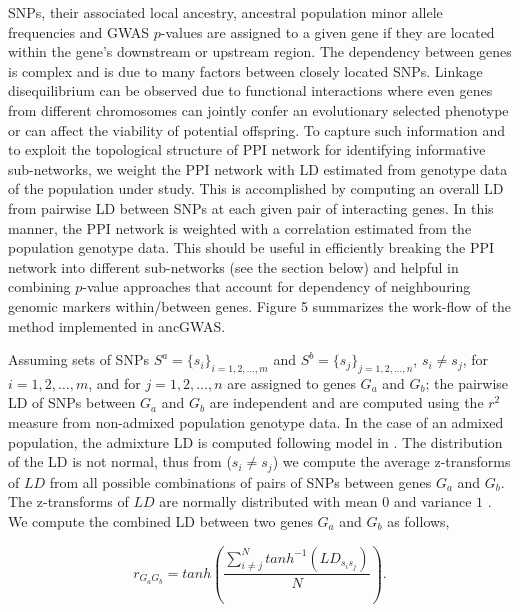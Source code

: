 \documentclass[10pt]{article}
\begin{document}
SNPs, their associated local ancestry, ancestral population minor allele frequencies and GWAS $p$-values are assigned to a given gene if they are located within the gene's downstream or upstream region. The dependency between genes is complex and is due to many factors \cite{lith,wu,peng} between closely located SNPs. Linkage disequilibrium can be observed due to functional interactions where even genes from different chromosomes can jointly confer an evolutionary selected phenotype or can affect the viability of potential offspring. To capture such information and to exploit the topological structure of PPI network for identifying informative sub-networks, we weight the PPI network with LD estimated from genotype data of the population under study. This is accomplished by computing an overall LD from pairwise LD between SNPs at each given pair of interacting genes. In this manner, the PPI network is weighted with a correlation estimated from the population genotype data. This should be useful in efficiently breaking the PPI network into different sub-networks (see the section below) and helpful in combining $p$-value approaches that account for dependency of neighbouring genomic markers within/between genes. Figure 5 summarizes the work-flow of the method implemented in ancGWAS.

Assuming sets of SNPs $S^{a}=\lbrace s_{i}\rbrace_{i=1,2,\ldots,m}$ and $S^{b}=\lbrace s_{j} \rbrace_{j=1,2,\ldots,n}$, $s_{i}\neq s_{j}$, for $i=1,2,\ldots,m$, and for $j=1,2,\ldots,n$ are assigned to genes $G_{a}$ and $G_{b}$; the pairwise LD of SNPs between $G_{a}$ and $G_{b}$ are independent and are computed using the $r^{2}$ measure \cite{kristin} from non-admixed population genotype data. In the case of an admixed population, the admixture LD is computed following model in \cite{loh,ad35}. The distribution of the LD is not normal, thus from ($s_{i}\neq s_{j}$) we compute the average z-transforms of $LD$ from all possible combinations of pairs of SNPs between genes $G_{a}$ and $G_{b}$. The z-transforms of $LD$ are normally distributed with mean $0$ and variance $1$ \cite{choi}. We compute the combined LD between two genes $G_{a}$ and $G_{b}$ as follows,

\begin{equation}
r_{G_{a}G_{b}}=tanh\left(\dfrac{\sum^{N}_{i\neq j} tanh^{-1}\left( LD_{s_{i}s_{j}}\right) }{N}\right). \label{(8.2)}
\end{equation}

\end{document}

